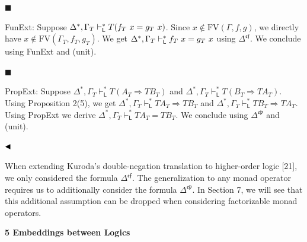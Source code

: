 \par\noindent  $\blacksquare$ 
 
FunExt: Suppose $\Delta^{*},\Gamma_{T}\vdash_{\mathsf{L}}^{*}T(f_{T}\leavevmode\nobreak\ x=g_{T}\leavevmode\nobreak\ x)$. Since $x\notin\text{{FV}}(\Gamma,f,g)$, we directly have $x\notin\text{{FV}}(\Gamma_{T},f_{T},g_{T})$. We get $\Delta^{*},\Gamma_{T}\vdash_{\mathsf{L}}^{*}f_{T}\leavevmode\nobreak\ x=g_{T}\leavevmode\nobreak\ x$ using $\Delta^{\mathfrak{e}\mathfrak{f}}$. We conclude using FunExt and (unit).\par
 
 
 
\par\noindent  $\blacksquare$ 
 
PropExt: Suppose $\Delta^{*},\Gamma_{T}\vdash_{\mathsf{L}}^{*}T(A_{T}\mathbin{\Rightarrow}TB_{T})$ and $\Delta^{*},\Gamma_{T}\vdash_{\mathsf{L}}^{*}T(B_{T}\mathbin{\Rightarrow}TA_{T})$. Using Proposition 2(5), we get $\Delta^{*},\Gamma_{T}\vdash_{\mathsf{L}}^{*}TA_{T}\mathbin{\Rightarrow}TB_{T}$ and $\Delta^{*},\Gamma_{T}\vdash_{\mathsf{L}}^{*}TB_{T}\mathbin{\Rightarrow}TA_{T}$. Using PropExt we derive $\Delta^{*},\Gamma_{T}\vdash_{\mathsf{L}}^{*}TA_{T}=TB_{T}$. We conclude using $\Delta^{\mathfrak{e}\mathfrak{p}}$ and (unit).\par
 
 
  
$\hfill\blacktriangleleft$\par
 
 
 
When extending Kuroda’s double-negation translation to higher-order logic [21], we only considered the formula $\Delta^{\mathfrak{e}\mathfrak{f}}$. The generalization to any monad operator requires us to additionally consider the formula $\Delta^{\mathfrak{e}\mathfrak{p}}$. In Section 7, we will see that this additional assumption can be dropped when considering factorizable monad operators.\par
 
 
 


 
\par\medskip\noindent\textbf{5 Embeddings between Logics}\par
 
